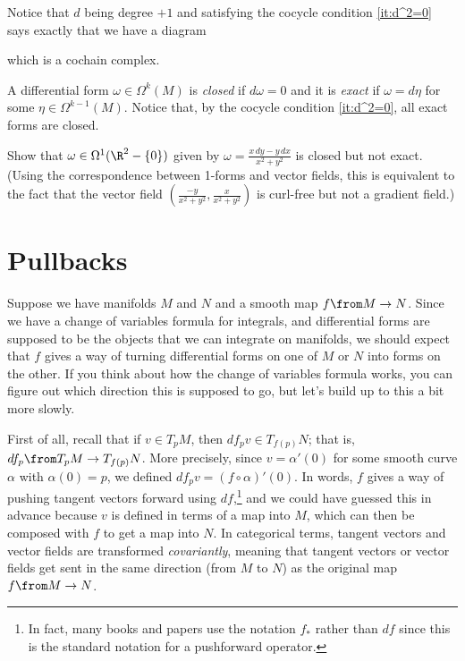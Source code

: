 Notice that $d$ being degree $+1$ and satisfying the cocycle condition \ref{it:d^2=0} says exactly that we have a diagram
	\begin{center}
	\end{center}
which is a cochain complex.
	
\begin{definition}\label{def:closed and exact}
	A differential form $\omega \in \Omega^k(M)$ is \emph{closed} if $d\omega = 0$ and it is \emph{exact} if $\omega = d\eta$ for some $\eta \in \Omega^{k-1}(M)$. Notice that, by the cocycle condition \ref{it:d^2=0}, all exact forms are closed.
\end{definition}

\begin{exercise}
	Show that $\omega \in \Omega^1(\R^2 - \{0\})$ given by $\omega = \frac{x\, dy - y \, dx}{x^2 + y^2}$ is closed but not exact. (Using the correspondence between 1-forms and vector fields, this is equivalent to the fact that the vector field $\left(\frac{-y}{x^2 + y^2}, \frac{x}{x^2+y^2}\right)$ is curl-free but not a gradient field.)
\end{exercise}

\section{Pullbacks}

Suppose we have manifolds $M$ and $N$ and a smooth map $f \from M \to N$. Since we have a change of variables formula for integrals, and differential forms are supposed to be the objects that we can integrate on manifolds, we should expect that $f$ gives a way of turning differential forms on one of $M$ or $N$ into forms on the other. If you think about how the change of variables formula works, you can figure out which direction this is supposed to go, but let's build up to this a bit more slowly.

First of all, recall that if $v \in T_pM$, then $df_p v \in T_{f(p)}N$; that is, $df_p \from T_pM \to T_{f(p)}N$. More precisely, since $v = \alpha'(0)$ for some smooth curve $\alpha$ with $\alpha(0) = p$, we defined $df_pv = (f \circ \alpha)'(0)$. In words, $f$ gives a way of pushing tangent vectors forward using $df$,\footnote{In fact, many books and papers use the notation $f_\ast$ rather than $df$ since this is the standard notation for a pushforward operator.} and we could have guessed this in advance because $v$ is defined in terms of a map into $M$, which can then be composed with $f$ to get a map into $N$. In categorical terms, tangent vectors and vector fields are transformed \emph{covariantly}, meaning that tangent vectors or vector fields get sent in the same direction (from $M$ to $N$) as the original map $f\from M \to N$.

